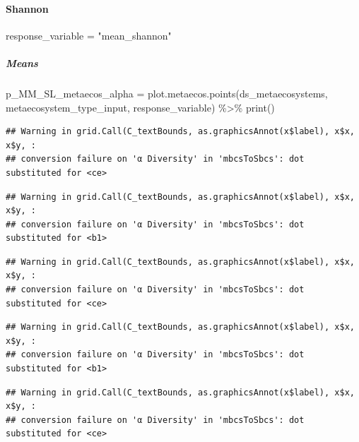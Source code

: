 \documentclass[
]{article}
\newenvironment{Shaded}{\begin{snugshade}}{\end{snugshade}}
\newcommand{\FunctionTok}[1]{\textcolor[rgb]{0.00,0.00,0.00}{#1}}
\newcommand{\NormalTok}[1]{#1}
\newcommand{\OtherTok}[1]{\textcolor[rgb]{0.56,0.35,0.01}{#1}}
\newcommand{\SpecialCharTok}[1]{\textcolor[rgb]{0.00,0.00,0.00}{#1}}
\newcommand{\StringTok}[1]{\textcolor[rgb]{0.31,0.60,0.02}{#1}}
\begin{document}
\hypertarget{shannon-1}{%
\paragraph{Shannon}\label{shannon-1}}

\begin{Shaded}
\begin{Highlighting}[]
\NormalTok{response\_variable }\OtherTok{=} \StringTok{"mean\_shannon"}
\end{Highlighting}
\end{Shaded}

\hypertarget{means-5}{%
\subparagraph{Means}\label{means-5}}

\begin{Shaded}
\begin{Highlighting}[]
\NormalTok{p\_MM\_SL\_metaecos\_alpha }\OtherTok{=} \FunctionTok{plot.metaecos.points}\NormalTok{(ds\_metaecosystems, }
\NormalTok{                                              metaecosystem\_type\_input,}
\NormalTok{                                              response\_variable) }\SpecialCharTok{\%\textgreater{}\%}
  \FunctionTok{print}\NormalTok{()}
\end{Highlighting}
\end{Shaded}

\begin{verbatim}
## Warning in grid.Call(C_textBounds, as.graphicsAnnot(x$label), x$x, x$y, :
## conversion failure on 'α Diversity' in 'mbcsToSbcs': dot substituted for <ce>
\end{verbatim}

\begin{verbatim}
## Warning in grid.Call(C_textBounds, as.graphicsAnnot(x$label), x$x, x$y, :
## conversion failure on 'α Diversity' in 'mbcsToSbcs': dot substituted for <b1>
\end{verbatim}

\begin{verbatim}
## Warning in grid.Call(C_textBounds, as.graphicsAnnot(x$label), x$x, x$y, :
## conversion failure on 'α Diversity' in 'mbcsToSbcs': dot substituted for <ce>
\end{verbatim}

\begin{verbatim}
## Warning in grid.Call(C_textBounds, as.graphicsAnnot(x$label), x$x, x$y, :
## conversion failure on 'α Diversity' in 'mbcsToSbcs': dot substituted for <b1>
\end{verbatim}

\begin{verbatim}
## Warning in grid.Call(C_textBounds, as.graphicsAnnot(x$label), x$x, x$y, :
## conversion failure on 'α Diversity' in 'mbcsToSbcs': dot substituted for <ce>
\end{verbatim}
\end{document}
